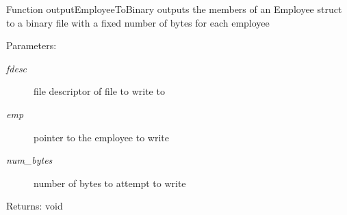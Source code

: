 Function output\-Employee\-To\-Binary outputs the members of an Employee struct to a binary file with a fixed number of bytes for each employee \begin{Desc}
\item[Parameters:]
\begin{description}
\item[{\em fdesc}]file descriptor of file to write to \item[{\em emp}]pointer to the employee to write \item[{\em num\_\-bytes}]number of bytes to attempt to write \end{description}
\end{Desc}
\begin{Desc}
\item[Returns:]void \end{Desc}
